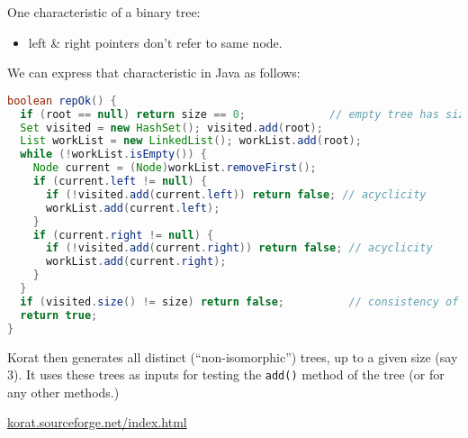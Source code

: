 \documentclass[11pt]{article}
\begin{document}
One characteristic of a binary tree:
\begin{itemize}
\item left \& right pointers don't refer to same node.
\end{itemize}

We can express that characteristic in Java as follows:
\begin{lstlisting}[language=Java]
boolean repOk() {
  if (root == null) return size == 0; 	   	      // empty tree has size 0
  Set visited = new HashSet(); visited.add(root);
  List workList = new LinkedList(); workList.add(root);
  while (!workList.isEmpty()) {
    Node current = (Node)workList.removeFirst();
    if (current.left != null) {
      if (!visited.add(current.left)) return false; // acyclicity
      workList.add(current.left);
    }
    if (current.right != null) {
      if (!visited.add(current.right)) return false; // acyclicity
      workList.add(current.right);
    }
  }
  if (visited.size() != size) return false; 	     // consistency of size
  return true;
}
\end{lstlisting}

Korat then generates all distinct (``non-isomorphic'') trees, 
    up to a given size (say 3).
It uses these trees as inputs for testing 
    the {\tt add()} method of the tree (or for any other methods.)

    \begin{center}
    \url{korat.sourceforge.net/index.html}
  \end{center}
\end{document}
